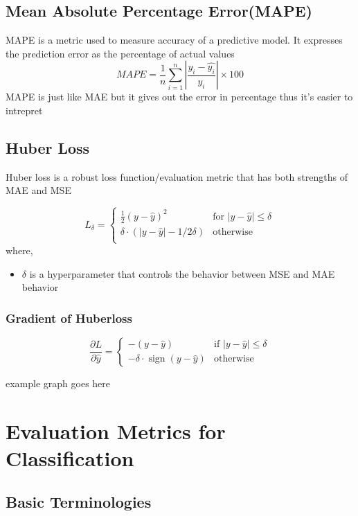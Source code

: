 \documentclass[12pt]{extarticle}
\begin{document}
\subsection{Mean Absolute Percentage Error(MAPE)}
MAPE is a metric used to measure accuracy of a predictive model. It expresses the 
prediction error as the percentage of actual values
$$ MAPE = \frac{1}{n}\sum_{i=1}^{n}\left|\frac{y_i-\hat{y_i}}{y_i}\right| \times 100 $$
MAPE is just like MAE but it gives out the error in percentage thus it's easier to intrepret 

\subsection{Huber Loss}
Huber loss is a robust loss function/evaluation metric that has both strengths of MAE and MSE


$$
L_\delta = 
\begin{cases} 
    \frac{1}{2}(y-\hat{y})^2 & \text{for }|y-\hat{y}| \le \delta \\
    \delta \cdot (|y-\hat{y}|-1/2 \delta) & \text{otherwise} \\
\end{cases}
$$
where, 
\begin{itemize}
    \item \( \delta \) is a hyperparameter that controls the behavior between 
        MSE and MAE behavior
\end{itemize}

\subsubsection{Gradient of Huberloss}

\[
\frac{\partial L}{\partial \hat{y}} =
\begin{cases}
-(y - \hat{y}) & \text{if } |y - \hat{y}| \leq \delta \\
-\delta \cdot \operatorname{sign}(y - \hat{y}) & \text{otherwise}
\end{cases}
\]

example graph goes here

\section{Evaluation Metrics for Classification}

\subsection{Basic Terminologies}
\end{document}
